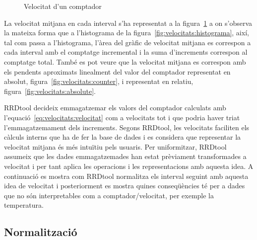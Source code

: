 \begin{figure}[tbp]
  \centering
  \caption{Velocitat d'un comptador}
  \label{fig:velocitats:velocitat}
\end{figure}

La velocitat mitjana en cada interval s'ha representat a la figura~\ref{fig:velocitats:velocitat} a on s'observa la mateixa forma que a l'histograma de la figura~\ref{fig:velocitats:histograma}, així, tal com passa a l'histograma,  l'àrea del gràfic de velocitat mitjana es correspon a cada interval amb el comptatge incremental i la suma d'increments correspon al comptatge total.
També es pot veure que la velocitat mitjana es correspon amb els pendents aproximats linealment del valor del comptador representat en absolut, figura~\ref{fig:velocitats:counter}, i representat en relatiu, figura~\ref{fig:velocitats:absolute}.


RRDtool decideix emmagatzemar els valors del comptador calculats amb l'equació~\ref{eq:velocitats:velocitat} com a velocitats tot i que podria haver triat l'emmagatzemament dels increments. Segons RRDtool, les velocitats faciliten els càlculs interns que ha de fer la base de dades i es considera que representar la velocitat mitjana és més intuïtiu pels usuaris. 
Per uniformitzar, RRDtool assumeix que les dades emmagatzemades han estat prèviament transformades a velocitat i per tant aplica les operacions i les representacions amb aquesta idea. A continuació es mostra com RRDtool normalitza els interval seguint amb aquesta idea de velocitat i posteriorment es mostra quines conseqüències té per a dades que no són interpretables com a comptador/velocitat, per exemple la temperatura.



\subsection{Normalització}

